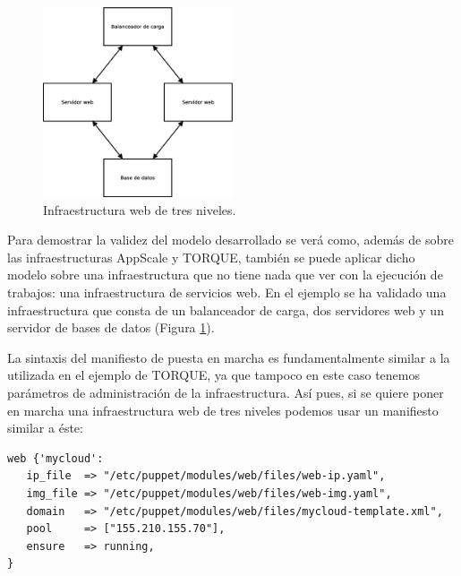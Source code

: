 \begin{figure} [!htbp]
  \centering
  \includegraphics[width=0.5\textwidth]{figuras/Arquitectura_Web2.eps}
  \caption{Infraestructura web de tres niveles.}
\label{figure:arquitectura-web}
\end{figure}

Para demostrar la validez del modelo desarrollado se verá como, además de sobre las infraestructuras AppScale y TORQUE, también se puede aplicar dicho modelo sobre una infraestructura que no tiene nada que ver con la ejecución de trabajos: una infraestructura de servicios web. En el ejemplo se ha validado una infraestructura que consta de un balanceador de carga, dos servidores web y un servidor de bases de datos (Figura \ref{figure:arquitectura-web}).



La sintaxis del manifiesto de puesta en marcha es fundamentalmente similar a la utilizada en el ejemplo de TORQUE, ya que tampoco en este caso tenemos parámetros de administración de la infraestructura. Así pues, si se quiere poner en marcha una infraestructura web de tres niveles podemos usar un manifiesto similar a éste:

\begin{lstlisting}
web {'mycloud':
   ip_file  => "/etc/puppet/modules/web/files/web-ip.yaml",
   img_file => "/etc/puppet/modules/web/files/web-img.yaml",
   domain   => "/etc/puppet/modules/web/files/mycloud-template.xml",
   pool     => ["155.210.155.70"],
   ensure   => running,
}
\end{lstlisting}

